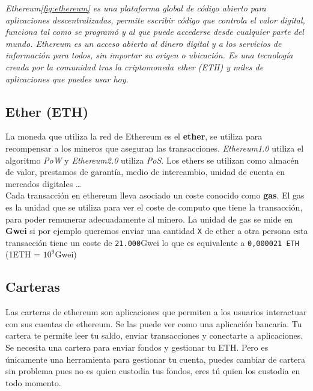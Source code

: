 \textit{Ethereum\ref{fig:ethereum} es una plataforma global de código abierto para aplicaciones descentralizadas, permite escribir código que controla el valor digital, funciona tal como se programó y al que puede accederse desde cualquier parte del mundo. Ethereum es un acceso abierto al dinero digital y a los servicios de información para todos, sin importar su origen o ubicación. Es una tecnología creada por la comunidad tras la criptomoneda ether (ETH) y miles de aplicaciones que puedes usar hoy.}

\subsection{Ether (ETH)}
La moneda que utiliza la red de Ethereum es el \textbf{ether}, se utiliza para recompensar a los mineros que aseguran las transacciones. \emph{Ethereum1.0} utiliza el algoritmo \textit{PoW} y \emph{Ethereum2.0} utiliza \textit{PoS}\cite{Ethereum2.0}. Los ethers se utilizan como almacén de valor, prestamos de garantía, medio de intercambio, unidad de cuenta en mercados digitales \dots \\

Cada transacción en ethereum lleva asociado un coste conocido como \textbf{gas}. El gas es la unidad que se utiliza para ver el coste de computo que tiene la transacción, para poder remunerar adecuadamente al minero. La unidad de gas se mide en \textbf{Gwei}\cite{Gwei} si por ejemplo queremos enviar una cantidad \verb|X| de ether a otra persona esta transacción tiene un coste de \verb|21.000|Gwei lo que es equivalente a \verb|0,000021 ETH| (1ETH = $10^9$Gwei)

\subsection{Carteras}

Las carteras de ethereum son aplicaciones que permiten a los usuarios interactuar con sus cuentas de ethereum. Se las puede ver como una aplicación bancaria. Tu cartera te permite leer tu saldo, enviar transacciones y conectarte a aplicaciones. Se necesita una cartera para enviar fondos y gestionar tu ETH. Pero es únicamente una herramienta para gestionar tu cuenta, puedes cambiar de cartera sin problema pues no es quien custodia tus fondos, eres tú quien los custodia en todo momento. \\

